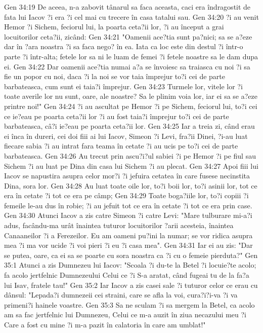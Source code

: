 Gen 34:19  De aceea, n-a zabovit tânarul sa faca aceasta, caci era îndragostit de fata lui Iacov ?i era ?i cel mai cu trecere în casa tatalui sau.
Gen 34:20  ?i au venit Hemor ?i Sichem, feciorul lui, la poarta ceta?ii lor, ?i au început a grai locuitorilor ceta?ii, zicând:
Gen 34:21  "Oamenii ace?tia sunt pa?nici; sa se a?eze dar în ?ara noastra ?i sa faca nego? în ea. Iata ca loc este din destul ?i într-o parte ?i într-alta; fetele lor sa ni le luam de femei ?i fetele noastre sa le dam dupa ei.
Gen 34:22  Dar oamenii ace?tia numai a?a se învoiesc sa traiasca cu noi ?i sa fie un popor cu noi, daca ?i la noi se vor taia împrejur to?i cei de parte barbateasca, cum sunt ei taia?i împrejur.
Gen 34:23  Turmele lor, vitele lor ?i toate averile lor nu sunt, oare, ale noastre? Sa le plinim voia lor, iar ei sa se a?eze printre noi!"
Gen 34:24  ?i au ascultat pe Hemor ?i pe Sichem, feciorul lui, to?i cei ce ie?eau pe poarta ceta?ii lor ?i au fost taia?i împrejur to?i cei de parte barbateasca, câ?i ie?eau pe poarta ceta?ii lor.
Gen 34:25  Iar a treia zi, când erau ei înca în dureri, cei doi fiii ai lui Iacov, Simeon ?i Levi, fra?ii Dinei, ?i-au luat fiecare sabia ?i au intrat fara teama în cetate ?i au ucis pe to?i cei de parte barbateasca.
Gen 34:26  Au trecut prin ascu?i?ul sabiei ?i pe Hemor ?i pe fiul sau Sichem ?i au luat pe Dina din casa lui Sichem ?i au plecat.
Gen 34:27  Apoi fiii lui Iacov se napustira asupra celor mor?i ?i jefuira cetatea în care fusese necinstita Dina, sora lor.
Gen 34:28  Au luat toate oile lor, to?i boii lor, to?i asinii lor, tot ce era în cetate ?i tot ce era pe câmp;
Gen 34:29  Toate boga?iile lor, to?i copiii ?i femeile le-au dus în robie; ?i au jefuit tot ce era în cetate ?i tot ce era prin case.
Gen 34:30  Atunci Iacov a zis catre Simeon ?i catre Levi: "Mare tulburare mi-a?i adus, facându-ma urât înaintea tuturor locuitorilor ?arii acesteia, înaintea Canaaneilor ?i a Ferezeilor. Eu am oameni pu?ini la numar; se vor ridica asupra mea ?i ma vor ucide ?i voi pieri ?i eu ?i casa mea".
Gen 34:31  Iar ei au zis: "Dar se putea, oare, ca ei sa se poarte cu sora noastra ca ?i cu o femeie pierduta?"
Gen 35:1  Atunci a zis Dumnezeu lui Iacov: "Scoala ?i du-te la Betel ?i locuie?te acolo; fa acolo jertfelnic Dumnezeului Celui ce ?i S-a aratat, când fugeai tu de la fa?a lui Isav, fratele tau!"
Gen 35:2  Iar Iacov a zis casei sale ?i tuturor celor ce erau cu dânsul: "Lepada?i dumnezeii cei straini, care se afla la voi, cura?i?i-va ?i va primeni?i hainele voastre.
Gen 35:3  Sa ne sculam ?i sa mergem la Betel, ca acolo am sa fac jertfelnic lui Dumnezeu, Celui ce m-a auzit în ziua necazului meu ?i Care a fost cu mine ?i m-a pazit în calatoria în care am umblat!"
